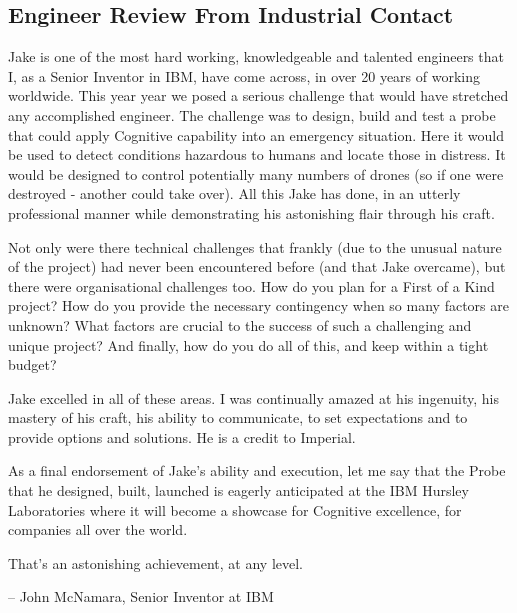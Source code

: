\documentclass{article}
\begin{document}
\subsection{Engineer Review From Industrial Contact}\label{JonReview}
\begin{itshape}
Jake is one of the most hard working, knowledgeable and talented engineers that I, as a Senior Inventor in IBM, have come across, in over 20 years of working worldwide.  This year year we posed a serious challenge that would have stretched any accomplished engineer. The challenge was to design, build and test a probe that could apply Cognitive capability into an emergency situation. Here it would be used to detect conditions hazardous to humans and locate those in distress. It would be designed to control  potentially many numbers of drones (so if one were destroyed - another could take over). All this Jake has done, in an utterly professional manner while demonstrating his astonishing flair through his craft.

Not only were there technical challenges that frankly (due to the unusual nature of the project) had never been encountered before (and that Jake overcame), but there were organisational challenges too. How do you plan for a First of a Kind project? How do you provide the necessary contingency when so many factors are unknown? What factors are crucial to the success of such a challenging and unique project? And finally, how do you do all of this, and keep within a tight budget?
 
Jake excelled in all of these areas. I was continually amazed at his ingenuity, his mastery of his craft, his ability to communicate, to set expectations and to provide options and solutions. He is a credit to Imperial.

As a final endorsement of Jake's ability and execution, let me say that the Probe that he designed, built, launched is eagerly anticipated at the IBM Hursley Laboratories where it will become a showcase for Cognitive excellence, for companies all over the world.

That's an astonishing achievement, at any level.\end{itshape} -- John McNamara, Senior Inventor at IBM
\end{document}
